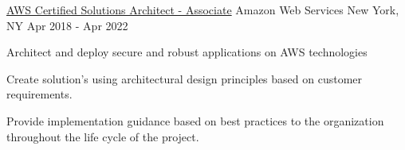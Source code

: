\begin{cventries}
  \cventry
    {\color{hyperlink} \href{https://www.certmetrics.com/amazon/public/badge.aspx?i=1&t=c&d=2018-04-10&ci=AWS00382630}{AWS Certified Solutions Architect - Associate}}
    {Amazon Web Services}
    {New York, NY}
    {Apr 2018 - Apr 2022}
    {
      \begin{cvitems}
      \item{ Architect and deploy secure and robust applications on AWS technologies}
        \item {Create solution's using architectural design principles based on customer requirements.}
        \item {Provide implementation guidance based on best practices to the organization throughout the life cycle of the project.}
      \end{cvitems}
    }
\end{cventries}
